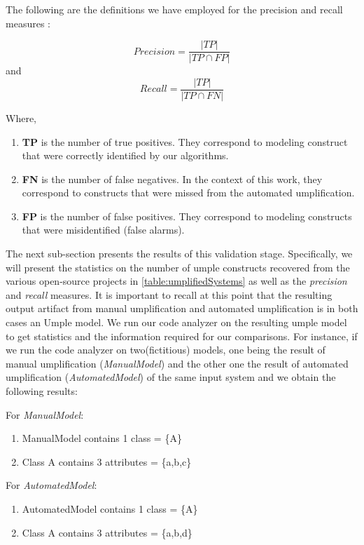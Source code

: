 The following are the definitions we have employed for the precision and recall measures \cite{precisionRecallDef}:

\[  Precision=\frac{|TP|}{|TP \cap FP|}\]
and \\
\[  Recall=\frac{|TP|}{|TP \cap FN|}\]

Where,
\begin{enumerate}
\label{sec:tuning}
\item \textbf{TP} is the number of true positives. They correspond to modeling construct that were correctly identified by our algorithms. 
\item \textbf{FN} is the number of false negatives.  In the context of this work, they correspond to constructs that were missed from the automated umplification. 
\item \textbf{FP} is the number of false positives. They correspond to modeling constructs that were misidentified (false alarms). 
\end{enumerate}

The next sub-section presents the results of this validation stage. Specifically, we will present the statistics on the number of umple constructs recovered from the various open-source projects in \ref{table:umplifiedSystems} as well as the \textit{precision} and \textit{recall} measures. It is important to recall at this point that the resulting output artifact from manual umplification and automated umplification is in both cases an Umple model. We run our code analyzer on the resulting umple model to get statistics and the information required for our comparisons. For instance, if we run the code analyzer on two(fictitious) models, one being the result of manual umplification (\textit{ManualModel}) and the other one the result of automated umplification (\textit{AutomatedModel}) of the same input system and we obtain the following results:

For \textit{ManualModel}:
\begin{enumerate}
\item ManualModel contains 1 class = \{A\}
\item Class A contains 3 attributes = \{a,b,c\}
\end{enumerate}

For \textit{AutomatedModel}:
\begin{enumerate}
\item AutomatedModel contains 1 class = \{A\}
\item Class A contains 3 attributes = \{a,b,d\}
\end{enumerate}

